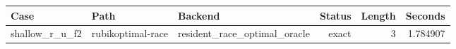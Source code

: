 {\small
\begin{tabular}{lllrrr}
\hline
Case & Path & Backend & Status & Length & Seconds \\
\hline
shallow\_r\_u\_f2 & rubikoptimal-race & resident\_race\_optimal\_oracle & exact & 3 & 1.784907 \\
\hline
\end{tabular}
}
